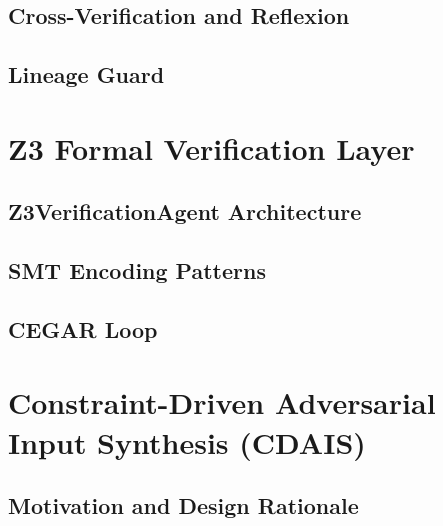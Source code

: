 \documentclass[12pt,a4paper]{report}
\begin{document}
  \subsection{Cross-Verification and Reflexion}
  \label{subsec:crossverify-impl}

  \subsection{Lineage Guard}
  \label{subsec:lineage-guard-impl}

\section{Z3 Formal Verification Layer}
\label{sec:z3-impl}

  \subsection{Z3VerificationAgent Architecture}
  \label{subsec:z3-arch-impl}

  \subsection{SMT Encoding Patterns}
  \label{subsec:z3-patterns}

  \subsection{CEGAR Loop}
  \label{subsec:cegar-impl}

\section{Constraint-Driven Adversarial Input Synthesis (CDAIS)}
\label{sec:cdais-impl}

  \subsection{Motivation and Design Rationale}
  \label{subsec:cdais-motivation}
\end{document}
